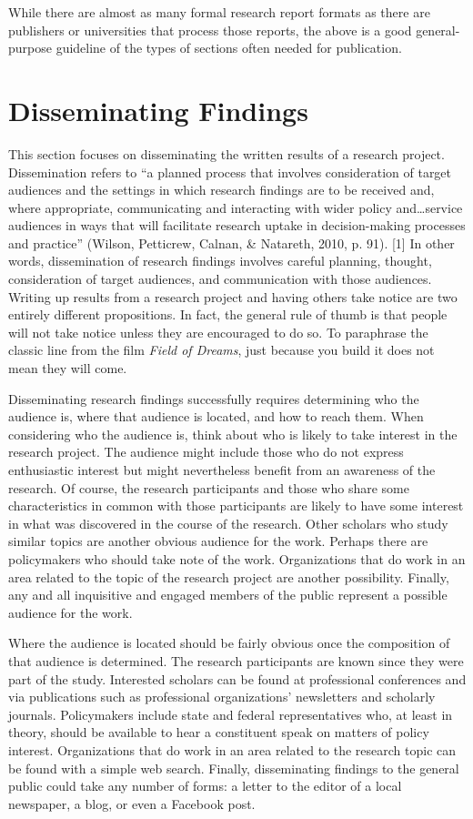 While there are almost as many formal research report formats as there are publishers or universities that process those reports, the above is a good general-purpose guideline of the types of sections often needed for publication.

\section{Disseminating Findings}

This section focuses on disseminating the written results of a research project. Dissemination refers to ``a planned process that involves consideration of target audiences and the settings in which research findings are to be received and, where appropriate, communicating and interacting with wider policy and…service audiences in ways that will facilitate research uptake in decision-making processes and practice'' (Wilson, Petticrew, Calnan, \& Natareth, 2010, p. 91). [1] In other words, dissemination of research findings involves careful planning, thought, consideration of target audiences, and communication with those audiences. Writing up results from a research project and having others take notice are two entirely different propositions. In fact, the general rule of thumb is that people will not take notice unless they are encouraged to do so. To paraphrase the classic line from the film \textit{Field of Dreams}, just because you build it does not mean they will come.

Disseminating research findings successfully requires determining who the audience is, where that audience is located, and how to reach them. When considering who the audience is, think about who is likely to take interest in the research project. The audience might include those who do not express enthusiastic interest but might nevertheless benefit from an awareness of the research. Of course, the research participants and those who share some characteristics in common with those participants are likely to have some interest in what was discovered in the course of the research. Other scholars who study similar topics are another obvious audience for the work. Perhaps there are policymakers who should take note of the work. Organizations that do work in an area related to the topic of the research project are another possibility. Finally, any and all inquisitive and engaged members of the public represent a possible audience for the work.

Where the audience is located should be fairly obvious once the composition of that audience is determined. The research participants are known since they were part of the study. Interested scholars can be found at professional conferences and via publications such as professional organizations' newsletters and scholarly journals. Policymakers include state and federal representatives who, at least in theory, should be available to hear a constituent speak on matters of policy interest. Organizations that do work in an area related to the research topic can be found with a simple web search. Finally, disseminating findings to the general public could take any number of forms: a letter to the editor of a local newspaper, a blog, or even a Facebook post.

